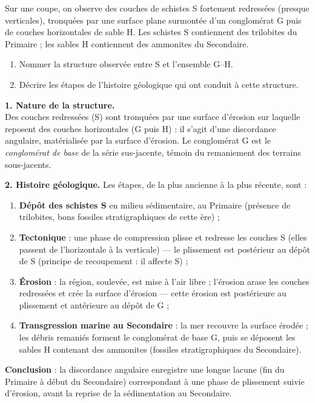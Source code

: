 \documentclass[11pt]{article}
\newcommand{\cle}[1]{{\popxbold\color{popdark}#1}}
\begin{document}
\begin{exoresolu}
Sur une coupe, on observe des couches de schistes S fortement redressées (presque verticales), tronquées par une surface plane surmontée d'un conglomérat G puis de couches horizontales de sable H. Les schistes S contiennent des trilobites du Primaire ; les sables H contiennent des ammonites du Secondaire.
\begin{enumerate}
\item Nommer la structure observée entre S et l'ensemble G--H.
\item Décrire les étapes de l'histoire géologique qui ont conduit à cette structure.
\end{enumerate}
\tcblower
\textbf{1. Nature de la structure.}\\
Des couches redressées (S) sont tronquées par une surface d'érosion sur laquelle reposent des couches horizontales (G puis H) : il s'agit d'une \cle{discordance angulaire}, matérialisée par la surface d'érosion. Le conglomérat G est le \emph{conglomérat de base} de la série sus-jacente, témoin du remaniement des terrains sous-jacents.

\textbf{2. Histoire géologique.} Les étapes, de la plus ancienne à la plus récente, sont :
\begin{enumerate}
\item \textbf{Dépôt des schistes S} en milieu sédimentaire, au Primaire (présence de trilobites, bons fossiles stratigraphiques de cette ère) ;
\item \textbf{Tectonique} : une phase de compression plisse et redresse les couches S (elles passent de l'horizontale à la verticale) — le plissement est postérieur au dépôt de S (principe de recoupement : il affecte S) ;
\item \textbf{Érosion} : la région, soulevée, est mise à l'air libre ; l'érosion arase les couches redressées et crée la surface d'érosion — cette érosion est postérieure au plissement et antérieure au dépôt de G ;
\item \textbf{Transgression marine au Secondaire} : la mer recouvre la surface érodée ; les débris remaniés forment le conglomérat de base G, puis se déposent les sables H contenant des ammonites (fossiles stratigraphiques du Secondaire).
\end{enumerate}
\textbf{Conclusion} : la discordance angulaire enregistre une longue lacune (fin du Primaire à début du Secondaire) correspondant à une phase de plissement suivie d'érosion, avant la reprise de la sédimentation au Secondaire.
\end{exoresolu}
\end{document}
